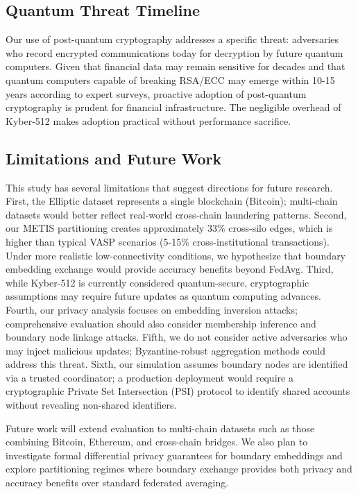 \documentclass[conference]{IEEEtran}
\begin{document}
\subsection{Quantum Threat Timeline}
Our use of post-quantum cryptography addresses a specific threat: adversaries who record encrypted communications today for decryption by future quantum computers. Given that financial data may remain sensitive for decades and that quantum computers capable of breaking RSA/ECC may emerge within 10-15 years according to expert surveys, proactive adoption of post-quantum cryptography is prudent for financial infrastructure. The negligible overhead of Kyber-512 makes adoption practical without performance sacrifice.

\subsection{Limitations and Future Work}
This study has several limitations that suggest directions for future research. First, the Elliptic dataset represents a single blockchain (Bitcoin); multi-chain datasets would better reflect real-world cross-chain laundering patterns. Second, our METIS partitioning creates approximately 33\% cross-silo edges, which is higher than typical VASP scenarios (5-15\% cross-institutional transactions). Under more realistic low-connectivity conditions, we hypothesize that boundary embedding exchange would provide accuracy benefits beyond FedAvg. Third, while Kyber-512 is currently considered quantum-secure, cryptographic assumptions may require future updates as quantum computing advances. Fourth, our privacy analysis focuses on embedding inversion attacks; comprehensive evaluation should also consider membership inference and boundary node linkage attacks. Fifth, we do not consider active adversaries who may inject malicious updates; Byzantine-robust aggregation methods could address this threat. Sixth, our simulation assumes boundary nodes are identified via a trusted coordinator; a production deployment would require a cryptographic Private Set Intersection (PSI) protocol to identify shared accounts without revealing non-shared identifiers.

Future work will extend evaluation to multi-chain datasets such as those combining Bitcoin, Ethereum, and cross-chain bridges. We also plan to investigate formal differential privacy guarantees for boundary embeddings and explore partitioning regimes where boundary exchange provides both privacy and accuracy benefits over standard federated averaging.
\end{document}
